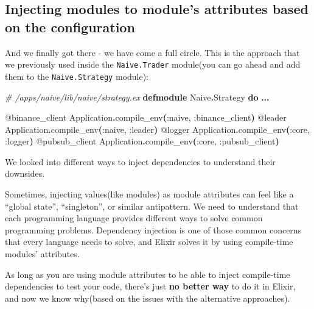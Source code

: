 \documentclass[
  oneside]{book}
\newenvironment{Shaded}{\begin{snugshade}}{\end{snugshade}}
\newcommand{\CommentTok}[1]{\textcolor[rgb]{0.56,0.35,0.01}{\textit{#1}}}
\newcommand{\ConstantTok}[1]{\textcolor[rgb]{0.56,0.35,0.01}{#1}}
\newcommand{\FunctionTok}[1]{\textcolor[rgb]{0.13,0.29,0.53}{\textbf{#1}}}
\newcommand{\KeywordTok}[1]{\textcolor[rgb]{0.13,0.29,0.53}{\textbf{#1}}}
\newcommand{\NormalTok}[1]{#1}
\newcommand{\OperatorTok}[1]{\textcolor[rgb]{0.81,0.36,0.00}{\textbf{#1}}}
\newcommand{\OtherTok}[1]{\textcolor[rgb]{0.56,0.35,0.01}{#1}}
\newcommand{\VariableTok}[1]{\textcolor[rgb]{0.00,0.00,0.00}{#1}}
\begin{document}
\subsection{Injecting modules to module's attributes based on the configuration}\label{injecting-modules-to-modules-attributes-based-on-the-configuration}

And we finally got there - we have come a full circle. This is the approach that we previously used inside the \texttt{Naive.Trader} module(you can go ahead and add them to the \texttt{Naive.Strategy} module):

\begin{Shaded}
\begin{Highlighting}[]
\CommentTok{\# /apps/naive/lib/naive/strategy.ex}
\KeywordTok{defmodule} \ConstantTok{Naive}\OperatorTok{.}\ConstantTok{Strategy} \KeywordTok{do}
  \OperatorTok{...}

  \OtherTok{@binance\_client} \ConstantTok{Application}\OperatorTok{.}\NormalTok{compile\_env}\FunctionTok{(}\VariableTok{:naive}\NormalTok{, }\VariableTok{:binance\_client}\FunctionTok{)}
  \OtherTok{@leader} \ConstantTok{Application}\OperatorTok{.}\NormalTok{compile\_env}\FunctionTok{(}\VariableTok{:naive}\NormalTok{, }\VariableTok{:leader}\FunctionTok{)}
  \OtherTok{@logger} \ConstantTok{Application}\OperatorTok{.}\NormalTok{compile\_env}\FunctionTok{(}\VariableTok{:core}\NormalTok{, }\VariableTok{:logger}\FunctionTok{)}
  \OtherTok{@pubsub\_client} \ConstantTok{Application}\OperatorTok{.}\NormalTok{compile\_env}\FunctionTok{(}\VariableTok{:core}\NormalTok{, }\VariableTok{:pubsub\_client}\FunctionTok{)}
\end{Highlighting}
\end{Shaded}

We looked into different ways to inject dependencies to understand their downsides.

Sometimes, injecting values(like modules) as module attributes can feel like a ``global state'', ``singleton'', or similar antipattern. We need to understand that each programming language provides different ways to solve common programming problems. Dependency injection is one of those common concerns that every language needs to solve, and Elixir solves it by using compile-time modules' attributes.

As long as you are using module attributes to be able to inject compile-time dependencies to test your code, there's just \textbf{no better way} to do it in Elixir, and now we know why(based on the issues with the alternative approaches).
\end{document}
